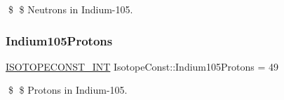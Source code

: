 \$ \$ Neutrons in Indium-\/105. \mbox{\label{group___isotope_const-_indium-_in105_gad29c1fe353c444f3b0497c7ac6b28a9b}} 
\subsubsection{\texorpdfstring{Indium105\+Protons}{Indium105Protons}}
{\footnotesize\ttfamily \mbox{\hyperlink{group___isotope_const-_macros_ga5f18360b3e99483a35c32d789e62621c}{I\+S\+O\+T\+O\+P\+E\+C\+O\+N\+S\+T\+\_\+\+I\+NT}} Isotope\+Const\+::\+Indium105\+Protons = 49}

\$ \$ Protons in Indium-\/105. 